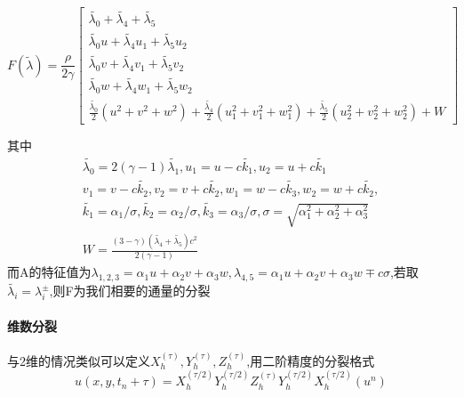 \documentclass[UTF8]{ctexart}
\begin{document}
    \begin{equation*}
    F(\tilde{\lambda})=\frac{\rho}{2\gamma}\left[\begin{matrix}
                                             \tilde{\lambda_0}+\tilde{\lambda_4}+\tilde{\lambda_5} \\
                                             \tilde{\lambda_0}u+ \tilde{\lambda_4}u_1+ \tilde{\lambda_5}u_2 \\
                                             \tilde{\lambda_0}v+ \tilde{\lambda_4}v_1+ \tilde{\lambda_5}v_2\\
                                             \tilde{\lambda_0}w+ \tilde{\lambda_4}w_1+ \tilde{\lambda_5}w_2\\
                                             \frac{\tilde{\lambda_0}}{2}(u^2+v^2+w^2) + \frac{\tilde{\lambda_4}}{2}(u_1^2+v_1^2+w_1^2) +  \frac{\tilde{\lambda_5}}{2}(u_2^2+v_2^2+w_2^2) +W
                                           \end{matrix}\right]
  \end{equation*}

  其中
  \begin{equation*}
    \begin{matrix}
    \tilde{\lambda_0}=2(\gamma-1)\tilde{\lambda_1},u_1=u-c\tilde{k_1},u_2=u+c\tilde{k_1} \\
    v_1=v-c\tilde{k_2},v_2=v+c\tilde{k_2},w_1=w-c\tilde{k_3},w_2=w+c\tilde{k_2},\\
    \tilde{k_1}=\alpha_1/\sigma,\tilde{k_2}=\alpha_2/\sigma,\tilde{k_3}=\alpha_3/\sigma,\sigma=\sqrt{\alpha_1^2+\alpha_2^2+\alpha_3^2} \\
    W = \frac{(3-\gamma)(\tilde{\lambda_4}+\tilde{\lambda_5})c^2}{2(\gamma-1)}
   \end{matrix}
  \end{equation*}
  而A的特征值为$\lambda_{1,2,3}=\alpha_1 u + \alpha_2 v+\alpha_3w, \lambda_{4,5}=\alpha_1 u + \alpha_2 v  + \alpha_3 w \mp c \sigma  $,若取$\tilde{\lambda_i}=\lambda_i^{\pm}$,则F为我们相要的通量的分裂
  
  \paragraph{维数分裂}
  与2维的情况类似可以定义$X_h^{(\tau)},Y_h^{(\tau)},Z_h^{(\tau)}$,用二阶精度的分裂格式
    $$
    u(x,y,t_n+\tau)=X_h^{(\tau/2)}Y_h^{(\tau/2)}Z_h^{(\tau)}Y_h^{(\tau/2)}X_h^{(\tau/2)}(u^n)
    $$
  
\end{document}
